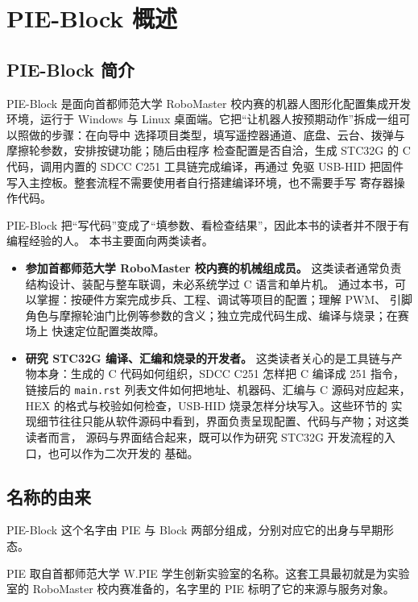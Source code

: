\chapter{PIE-Block 概述}
\label{ch:intro}

\section{PIE-Block 简介}

PIE-Block 是面向首都师范大学 RoboMaster 校内赛的机器人图形化配置集成开发环境，运行于
Windows 与 Linux 桌面端。它把“让机器人按预期动作”拆成一组可以照做的步骤：在向导中
选择项目类型，填写遥控器通道、底盘、云台、拨弹与摩擦轮参数，安排按键功能；随后由程序
检查配置是否自洽，生成 STC32G 的 C 代码，调用内置的 SDCC C251 工具链完成编译，再通过
免驱 USB-HID 把固件写入主控板。整套流程不需要使用者自行搭建编译环境，也不需要手写
寄存器操作代码。

PIE-Block 把“写代码”变成了“填参数、看检查结果”，因此本书的读者并不限于有编程经验的人。
本书主要面向两类读者。

\begin{itemize}
  \item \textbf{参加首都师范大学 RoboMaster 校内赛的机械组成员。}
        这类读者通常负责结构设计、装配与整车联调，未必系统学过 C 语言和单片机。
        通过本书，可以掌握：按硬件方案完成步兵、工程、调试等项目的配置；理解 PWM、
        引脚角色与摩擦轮油门比例等参数的含义；独立完成代码生成、编译与烧录；在赛场上
        快速定位配置类故障。

  \item \textbf{研究 STC32G 编译、汇编和烧录的开发者。}
        这类读者关心的是工具链与产物本身：生成的 C 代码如何组织，SDCC C251 怎样把 C
        编译成 251 指令，链接后的 \texttt{main.rst} 列表文件如何把地址、机器码、汇编与
        C 源码对应起来，HEX 的格式与校验如何检查，USB-HID 烧录怎样分块写入。这些环节的
        实现细节往往只能从软件源码中看到，界面负责呈现配置、代码与产物；对这类读者而言，
        源码与界面结合起来，既可以作为研究 STC32G 开发流程的入口，也可以作为二次开发的
        基础。
\end{itemize}

\section{名称的由来}

PIE-Block 这个名字由 PIE 与 Block 两部分组成，分别对应它的出身与早期形态。

PIE 取自首都师范大学 W.PIE 学生创新实验室的名称。这套工具最初就是为实验室的
RoboMaster 校内赛准备的，名字里的 PIE 标明了它的来源与服务对象。

